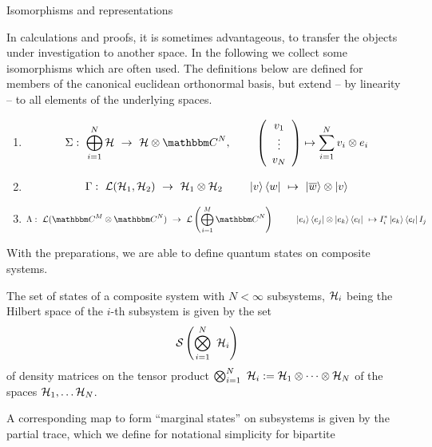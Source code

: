  \begin{subsection}{Isomorphisms and representations} 
 
 In calculations and proofs, it is sometimes advantageous, to transfer the objects under investigation to another space. In the following we collect some isomorphisms
 which are often used. The definitions below are defined for members of the canonical euclidean orthonormal basis, but extend -- by linearity -- to all elements of the underlying spaces. 
 \begin{enumerate}
  \item 
 \begin{align*}
   \Sigma: \ \bigoplus_{i=1}^N \cH \   
   \rightarrow \ \cH \otimes \bbmC^N,  \hspace{.8cm}
    \left(\begin{array}{c} v_1 \\ \vdots \\ v_N \end{array} \right)  \mapsto \sum_{i=1}^N v_i \otimes e_i 
 \end{align*}
 \item 
 \begin{align}
  \Gamma: \ {\mathcal L}({\mathcal H}_1,{\mathcal H}_2) \ \rightarrow \ {\mathcal H}_1 \otimes {\mathcal H}_2 \hspace{.8cm} \ket{v}\bra{w} \  \mapsto \ \ket{\overline{w}} \otimes \ket{v} \label{def:iso_gamma}
 \end{align}
 \item 
 \begin{align*}
  \Lambda: \ \cL(\bbmC^M \otimes \bbmC^N) \ 
   \rightarrow  \ \cL\left(\bigoplus_{i=1}^M \bbmC^N\right) \ \hspace{.8cm}
   \ket{e_i} \bra{e_j} \otimes \ket{e_k}\bra{e_l} \
   \mapsto  I_i^\ast \ket{e_k}\bra{e_l} I_j
  \end{align*}
 \end{enumerate}
With the preparations, we are able to define quantum states on composite systems.
\begin{definition} 
 The set of states of a composite system with $N < \infty$ subsystems, ${\mathcal H}_i$ being the Hilbert space of the $i$-th subsystem is given by the set
 \begin{align*}
  {\mathcal S}\left(\bigotimes_{i=1}^N \ {\mathcal H}_i \right)
 \end{align*}
 of density matrices on the tensor product $\bigotimes_{i=1}^{N} \ {\mathcal H}_i := {\mathcal H}_1 \otimes \dots \otimes {\mathcal H}_N$ of the spaces ${\mathcal H}_1, \dots {\mathcal H}_N$. 
\end{definition}
A corresponding map to form ``marginal states'' on subsystems is given by the partial trace, which we define for notational simplicity for bipartite

\end{subsection}
